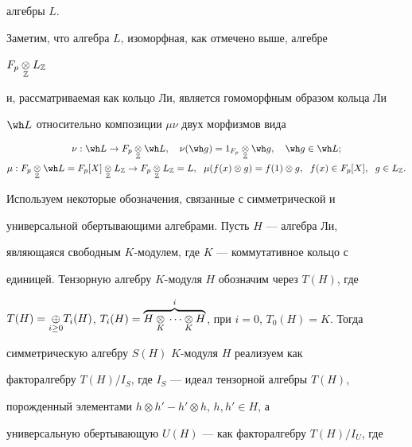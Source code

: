 алгебры $L$. 


 


Заметим, что алгебра $L$, изоморфная, как отмечено выше, алгебре 


$F_p\underset{\Bbb Z}{\otimes}{}L_{\Bbb Z}$ 


и, рассматриваемая как кольцо Ли, является гомоморфным образом кольца Ли 


$\wh L$ относительно композиции $\mu\nu$ двух морфизмов вида 


\begin{gather*} 


\nu:\wh L\to F_p\down{\Bbb Z}{\otimes}\wh L,\quad 


\nu(\wh g)=1_{F_p}\down{\Bbb Z}{\otimes}\wh g,\quad 


\wh g\in\wh L;\\ 


% 


\mu:F_p\down{\Bbb Z}{\otimes}\wh L=F_p[X]\down{\Bbb Z}{\otimes} 


L_{\Bbb Z}\to F_p\down{\Bbb Z}{\otimes}L_{\Bbb Z}=L,\ \;


\mu(f(x)\otimes g)=f(1)\otimes g,\ \; f(x)\in F_p[X],\ \;


g\in L_{\Bbb Z}. 


\end{gather*} 


 


Используем некоторые обозначения, связанные с симметрической и 


универсальной обертывающими алгебрами. Пусть $H$ --- алгебра Ли, 


являющаяся свободным $K$-модулем, где $K$ --- коммутативное кольцо с 


единицей. Тензорную алгебру $K$-модуля $H$ обозначим через $T(H)$, где 


$T(H)=\down{i\ge0}{\oplus}T_i(H)$, $T_i(H)=\overbrace{H\down{K}{\otimes} 


\dotsb \down{K}{\otimes}H}^i$, при $i=0$, $T_0(H)=K$. Тогда 


симметрическую алгебру $S(H)$\; $K$-модуля $H$ реализуем как 


факторалгебру $T(H)/I_S$, где $I_S$ --- идеал тензорной алгебры $T(H)$, 


порожденный элементами $h\otimes h'-h'\otimes h$, $h,h'\in H$, а 


универсальную обертывающую $U(H)$ --- как факторалгебру $T(H)/I_U$, где 


